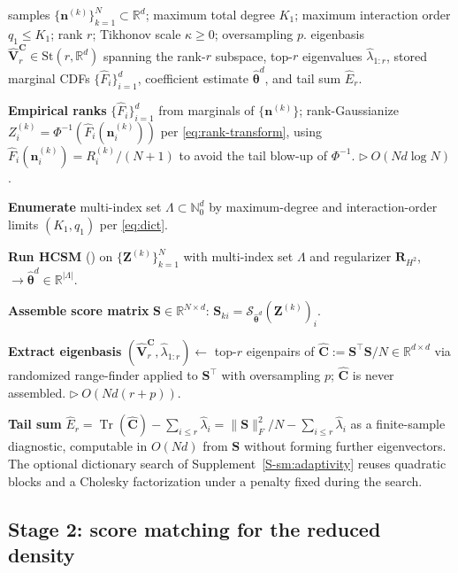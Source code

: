 \documentclass[review,hidelinks,onefignum,onetabnum]{siamart251216}
\newcommand{\RR}{\mathbb{R}}
\newcommand{\NN}{\mathbb{N}}
\newcommand{\tr}{\operatorname{Tr}}
\newcommand{\mC}{\bm{C}}
\newcommand{\hmC}{\widehat{\bm{C}}}
\newcommand{\hmV}{\widehat{\bm{V}}}
\newcommand{\mS}{\bm{S}}
\newcommand{\mR}{\bm{R}}
\newcommand{\St}{\mathrm{St}}
\newcommand{\whvtheta}{\widehat{\bm{\theta}}^{d}}
\newcommand{\vn}{\bm{n}}
\newcommand{\vZ}{\bm{Z}}
\newcommand{\scS}{\mathcal{S}}
\begin{document}
\begin{algorithm}[h]
\caption{\textsc{Cas} Stage 1 (subspace identification).}
\label{alg:cas}
\small
\begin{algorithmic}[1]
\Require samples $\{\vn^{(k)}\}_{k=1}^N \subset \RR^d$; maximum total degree $K_1$; maximum interaction order $q_1 \leq K_1$; rank $r$; Tikhonov scale $\kappa \geq 0$; oversampling $p$.
\Ensure eigenbasis $\hmV_r^{\mC} \in \St(r,\RR^d)$ spanning the rank-$r$ subspace, top-$r$ eigenvalues $\widehat\lambda_{1:r}$, stored marginal CDFs $\{\widehat F_i\}_{i=1}^d$, coefficient estimate $\whvtheta$, and tail sum $\widehat E_r$.

\State \textbf{Empirical ranks} $\{\widehat F_i\}_{i=1}^d$ from marginals of $\{\vn^{(k)}\}$; rank-Gaussianize $Z_i^{(k)} = \Phi^{-1}(\widehat F_i(\vn_i^{(k)}))$ per \eqref{eq:rank-transform}, using $\widehat F_i(\vn_i^{(k)}) = R_i^{(k)}/(N+1)$ to avoid the tail blow-up of $\Phi^{-1}$. $\triangleright\ O(Nd\log N)$.

\State \textbf{Enumerate} multi-index set $\Lambda \subset \NN_0^d$ by maximum-degree and interaction-order limits $(K_1, q_1)$ per \eqref{eq:dict}.

\State \textbf{Run HCSM} () on $\{\vZ^{(k)}\}_{k=1}^N$ with multi-index set $\Lambda$ and regularizer $\mR_{H^2}$, $\to \whvtheta \in \RR^{|\Lambda|}$.

\State \textbf{Assemble score matrix} $\mS \in \RR^{N \times d}$: $\mS_{ki} = \scS_{\whvtheta}(\vZ^{(k)})_i$.

\State \textbf{Extract eigenbasis} $(\hmV_r^{\mC}, \widehat\lambda_{1:r}) \gets $ top-$r$ eigenpairs of $\hmC := \mS^\top\mS / N \in \RR^{d\times d}$ via randomized range-finder \cite{HalkoMartinssonTropp2011} applied to $\mS^\top$ with oversampling $p$; $\hmC$ is never assembled. $\triangleright\ O(Nd(r+p))$.

\State \textbf{Tail sum} $\widehat E_r = \tr(\hmC) - \sum_{i\le r}\widehat\lambda_i = \|\mS\|_F^2/N - \sum_{i\le r}\widehat\lambda_i$ as a finite-sample diagnostic, computable in $O(Nd)$ from $\mS$ without forming further eigenvectors. The optional dictionary search of Supplement~\ref{S-sm:adaptivity} reuses quadratic blocks and a Cholesky factorization under a penalty fixed during the search.
\end{algorithmic}
\end{algorithm}


\subsection{Stage 2: score matching for the reduced density}
\label{sec:reduced-model}
\end{document}

